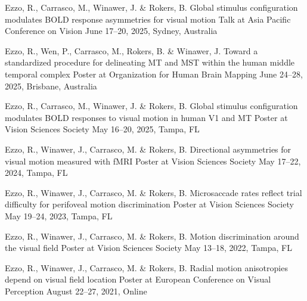 \begin{cventries}
  \cventry
    {Ezzo, R., Carrasco, M., Winawer, J. \& Rokers, B.}
    {Global stimulus configuration modulates BOLD response asymmetries for visual motion}
    {Talk at Asia Pacific Conference on Vision}
    {June 17–20, 2025, Sydney, Australia}
    {}

  \cventry
    {Ezzo, R., Wen, P., Carrasco, M., Rokers, B. \& Winawer, J.}
    {Toward a standardized procedure for delineating MT and MST within the human middle temporal complex}
    {Poster at Organization for Human Brain Mapping}
    {June 24–28, 2025, Brisbane, Australia}
    {}

  \cventry
    {Ezzo, R., Carrasco, M., Winawer, J. \& Rokers, B.}
    {Global stimulus configuration modulates BOLD responses to visual motion in human V1 and MT}
    {Poster at Vision Sciences Society}
    {May 16–20, 2025, Tampa, FL}
    {}

  \cventry
    {Ezzo, R., Winawer, J., Carrasco, M. \& Rokers, B.}
    {Directional asymmetries for visual motion measured with fMRI}
    {Poster at Vision Sciences Society}
    {May 17–22, 2024, Tampa, FL}
    {}

  \cventry
    {Ezzo, R., Winawer, J., Carrasco, M. \& Rokers, B.}
    {Microsaccade rates reflect trial difficulty for perifoveal motion discrimination}
    {Poster at Vision Sciences Society}
    {May 19–24, 2023, Tampa, FL}
    {}

  \cventry
    {Ezzo, R., Winawer, J., Carrasco, M. \& Rokers, B.}
    {Motion discrimination around the visual field}
    {Poster at Vision Sciences Society}
    {May 13–18, 2022, Tampa, FL}
    {}

  \cventry
    {Ezzo, R., Winawer, J., Carrasco, M. \& Rokers, B.}
    {Radial motion anisotropies depend on visual field location}
    {Poster at European Conference on Visual Perception}
    {August 22–27, 2021, Online}
    {}
\end{cventries}
